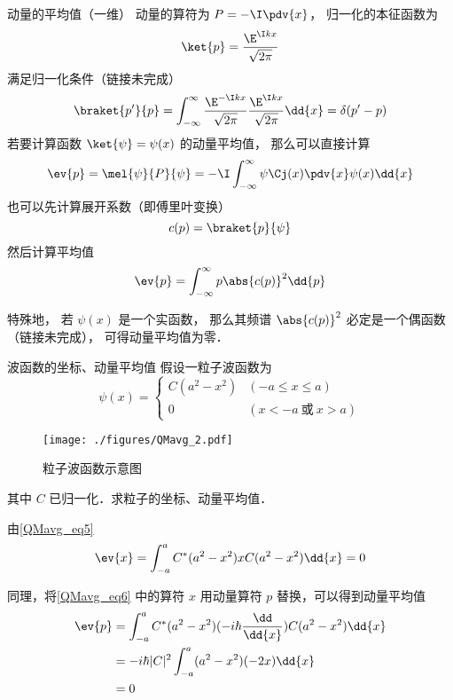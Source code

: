\begin{example}{动量的平均值（一维）}
动量的算符为 $P = -\I\pdv{x}$， 归一化的本征函数为
\begin{equation}
\ket{p} = \frac{\E^{\I k x}}{\sqrt{2\pi}}
\end{equation}
满足归一化条件（链接未完成）
\begin{equation}
\braket{p'}{p} = \int_{-\infty}^{\infty} \frac{\E^{-\I k x}}{\sqrt{2\pi}} \frac{\E^{\I k x}}{\sqrt{2\pi}} \dd{x} = \delta(p' - p)
\end{equation}
若要计算函数 $\ket{\psi} = \psi(x)$ 的动量平均值， 那么可以直接计算
\begin{equation}
\ev{p} = \mel{\psi}{P}{\psi} = -\I\int_{-\infty}^{\infty} \psi\Cj(x) \pdv{x} \psi(x) \dd{x}
\end{equation}
也可以先计算展开系数（即傅里叶变换）
\begin{equation}
c(p) = \braket{p}{\psi}
\end{equation}
然后计算平均值
\begin{equation}
\ev{p} = \int_{-\infty}^{\infty} p \abs{c(p)}^2\dd{p}
\end{equation}

特殊地， 若 $\psi(x)$ 是一个实函数， 那么其频谱 $\abs{c(p)}^2$ 必定是一个偶函数（链接未完成）， 可得动量平均值为零．
\end{example}

\begin{example}{波函数的坐标、动量平均值}
假设一粒子波函数为
\begin{equation}
\psi(x)=
\begin{cases}
C(a^2-x^2) &(-a\leqslant x\leqslant a)\\
0 &(x<-a \ \text{或}\ x>a) 
\end{cases}
\end{equation}
\begin{figure}[ht]
\centering
\texttt{[image: ./figures/QMavg\_2.pdf]}
\caption{粒子波函数示意图} \label{QMavg_fig2}
\end{figure}
其中 $C$ 已归一化．求粒子的坐标、动量平均值．

由\autoref{QMavg_eq5} 
\begin{equation}\label{QMavg_eq6}
\ev{x}= \int_{-a}^a C^*(a^2-x^2)xC(a^2-x^2)\dd{x} = 0
\end{equation}

同理，将\autoref{QMavg_eq6} 中的算符 $x$ 用动量算符 $p$ 替换，可以得到动量平均值
\begin{equation}
\begin{aligned}
\ev{p} &= \int_{-a}^a C^*(a^2-x^2)(-i\hbar\frac{\dd}{\dd{x}})C(a^2-x^2)\dd{x}\\
&= -i\hbar |C|^2\int_{-a}^a (a^2-x^2)(-2x)\dd{x}\\
&= 0
\end{aligned}
\end{equation}
\end{example}

